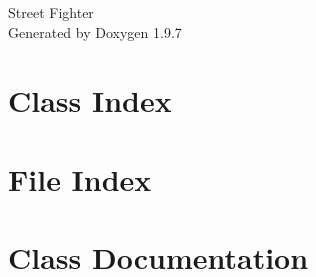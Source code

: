 \documentclass[twoside]{book}
\newcommand{\+}{\discretionary{\mbox{\scriptsize$\hookleftarrow$}}{}{}}
\newcommand{\clearemptydoublepage}{%
    \newpage{\pagestyle{empty}\cleardoublepage}%
  }
\begin{document}
  \raggedbottom
    \hypersetup{pageanchor=false,
                bookmarksnumbered=true,
                pdfencoding=unicode
               }
  \begin{titlepage}
  \vspace*{7cm}
  \begin{center}%
  {\Large Street Fighter}\\
  \vspace*{1cm}
  {\large Generated by Doxygen 1.9.7}\\
  \end{center}
  \end{titlepage}
  \clearemptydoublepage
  \tableofcontents
  \clearemptydoublepage
  \hypersetup{pageanchor=true}
\chapter{Class Index}

\chapter{File Index}

\chapter{Class Documentation}








































\end{document}
